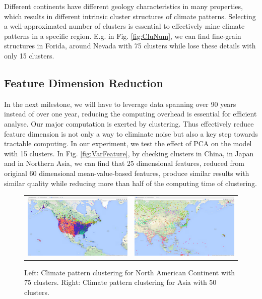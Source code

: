 Different continents have different geology characteristics in many properties, which results in different intrinsic cluster structures of climate patterns. Selecting a well-approximated number of clusters is essential to effectively mine climate patterns in a specific region. E.g. in Fig. \ref{fig:CluNum}, we can find fine-grain structures in Forida, around Nevada with 75 clusters while lose these details with only 15 clusters.

\subsection{Feature Dimension Reduction}
In the next milestone, we will have to leverage data spanning over 90 years instead of over one year, reducing the computing overhead is essential for efficient analyse. Our major computation is exerted by clustering. Thus effectively reduce feature dimension is not only a way to eliminate noise but also a key step towards tractable computing. In our experiment, we test the effect of PCA on the model with 15 clusters. In Fig. \ref{fig:VarFeature}, by checking clusters in China, in Japan and in Northern Asia, we can find that 25 dimensional features, reduced from original 60 dimensional mean-value-based features, produce similar results with similar quality while reducing more than half of the computing time of clustering.
\newpage
\begin{figure}[H]
    \centering
    \begin{tabular}{c c}
        \includegraphics[width=.4\linewidth]{./figure/Ave_60_comp_75_clu_USA.png}
        & \includegraphics[width=.4\linewidth]{./figure/Ave_60_comp_50_clu_Asia.png}
    \end{tabular}
    \caption{Left: Climate pattern clustering for North American Continent with 75 clusters. Right: Climate pattern clustering for Asia with 50 clusters.}
    \label{fig:AsiaUSAVer}
\end{figure}
